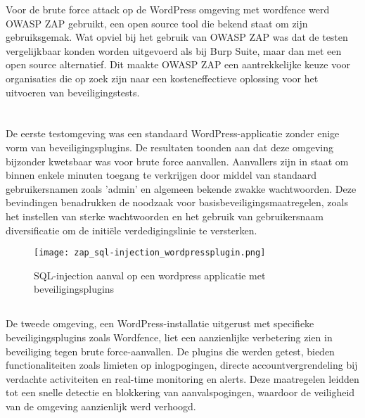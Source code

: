 Voor de brute force attack op de WordPress omgeving met wordfence werd OWASP ZAP gebruikt, een open source tool die bekend staat om zijn gebruiksgemak. 
Wat opviel bij het gebruik van OWASP ZAP was dat de testen vergelijkbaar konden worden uitgevoerd als bij Burp Suite, maar dan met een open source alternatief. 
Dit maakte OWASP ZAP een aantrekkelijke keuze voor organisaties die op zoek zijn naar een kosteneffectieve oplossing voor het uitvoeren van beveiligingstests.


\section{}
\subsection{}
De eerste testomgeving was een standaard WordPress-applicatie zonder enige vorm van beveiligingsplugins. De resultaten toonden aan dat deze 
omgeving bijzonder kwetsbaar was voor brute force aanvallen. Aanvallers zijn in staat om binnen enkele minuten toegang te verkrijgen door middel 
van standaard gebruikersnamen zoals 'admin' en algemeen bekende zwakke wachtwoorden. Deze bevindingen benadrukken de noodzaak voor 
basisbeveiligingsmaatregelen, zoals het instellen van sterke wachtwoorden en het gebruik van gebruikersnaam diversificatie om de initiële 
verdedigingslinie te versterken.

\begin{figure}
    \centering
    \texttt{[image: zap\_sql-injection\_wordpressplugin.png]}
    \caption[SQL-injection aanval op een wordpress applicatie met beveiligingsplugins]{SQL-injection aanval op een wordpress applicatie met beveiligingsplugins}
\end{figure}
\subsection{}
De tweede omgeving, een WordPress-installatie uitgerust met specifieke beveiligingsplugins zoals Wordfence, liet een aanzienlijke 
verbetering zien in beveiliging tegen brute force-aanvallen. De plugins die werden getest, bieden functionaliteiten zoals limieten 
op inlogpogingen, directe accountvergrendeling bij verdachte activiteiten en real-time monitoring en alerts. Deze maatregelen 
leidden tot een snelle detectie en blokkering van aanvalspogingen, waardoor de veiligheid van de omgeving aanzienlijk werd verhoogd.

